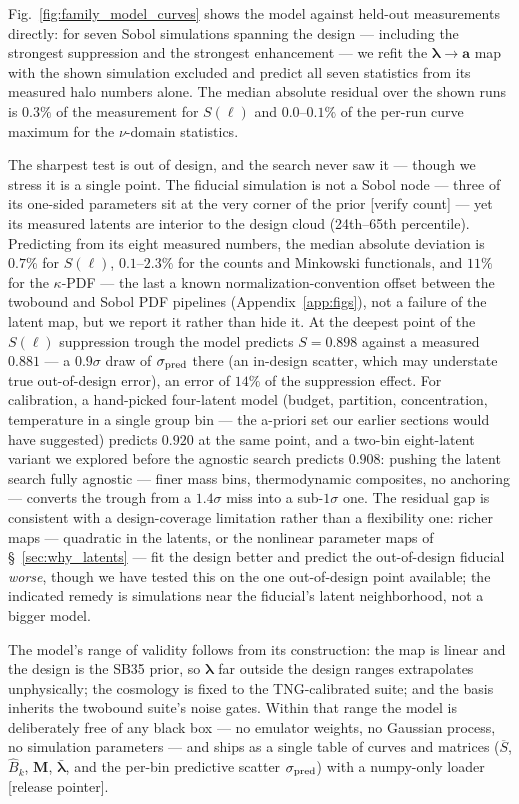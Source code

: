 \documentclass[linenumbers,trackchanges, twocolumn]{aastex701}
\begin{document}
Fig.~\ref{fig:family_model_curves} shows the model against held-out
measurements directly: for seven Sobol simulations spanning the design
--- including the strongest suppression and the strongest enhancement
--- we refit the $\bm{\lambda}\to\bm{a}$ map with the shown simulation
excluded and predict all seven statistics from its measured halo
numbers alone. The median absolute residual over the shown runs is
$0.3\%$ of the measurement for $S(\ell)$ and $0.0$--$0.1\%$ of the
per-run curve maximum for the $\nu$-domain statistics.

The sharpest test is out of design, and the search never saw it ---
though we stress it is a single point. The fiducial simulation is not
a Sobol node --- three of its one-sided parameters sit at the very
corner of the prior [verify count] --- yet its measured latents are
interior to the design cloud (24th--65th percentile). Predicting from
its eight measured numbers, the median absolute deviation is $0.7\%$
for $S(\ell)$, $0.1$--$2.3\%$ for the counts and Minkowski
functionals, and $11\%$ for the $\kappa$-PDF --- the last a known
normalization-convention offset between the twobound and Sobol PDF
pipelines (Appendix~\ref{app:figs}), not a failure of the latent map, but we
report it rather than hide it. At the deepest point of the $S(\ell)$
suppression trough the model predicts $S = 0.898$ against a measured
$0.881$ --- a $0.9\sigma$ draw of $\sigma_{\rm pred}$ there (an
in-design scatter, which may understate true out-of-design error), an
error of $14\%$ of the suppression effect. For calibration, a
hand-picked four-latent model (budget, partition, concentration,
temperature in a single group bin --- the a-priori set our earlier
sections would have suggested) predicts $0.920$ at the same point, and
a two-bin eight-latent variant we explored before the agnostic search
predicts $0.908$: pushing the latent search fully agnostic --- finer
mass bins, thermodynamic composites, no anchoring --- converts the
trough from a $1.4\sigma$ miss into a sub-$1\sigma$ one. The residual
gap is consistent with a design-coverage limitation rather than a
flexibility one: richer maps --- quadratic in the latents, or the
nonlinear parameter maps of \S~\ref{sec:why_latents} --- fit the
design better and predict the out-of-design fiducial \emph{worse},
though we have tested this on the one out-of-design point available;
the indicated remedy is simulations near the fiducial's latent
neighborhood, not a bigger model.

The model's range of validity follows from its construction: the map
is linear and the design is the SB35 prior, so $\bm{\lambda}$ far
outside the design ranges extrapolates unphysically; the cosmology is
fixed to the TNG-calibrated suite; and the basis inherits the twobound
suite's noise gates. Within that range the model is deliberately free
of any black box --- no emulator weights, no Gaussian process, no
simulation parameters --- and ships as a single table of curves and
matrices ($\overline{S}$, $\hat B_k$, $\bm{M}$,
$\bar{\bm{\lambda}}$, and the per-bin predictive scatter
$\sigma_{\rm pred}$) with a numpy-only loader [release pointer].
\end{document}
